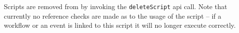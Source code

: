 Scripts are removed from \Rapture by invoking the \verb+deleteScript+ api call. Note that currently no
reference checks are made as to the usage of the script -- if a workflow or an event is linked to this
script it will no longer execute correctly.

